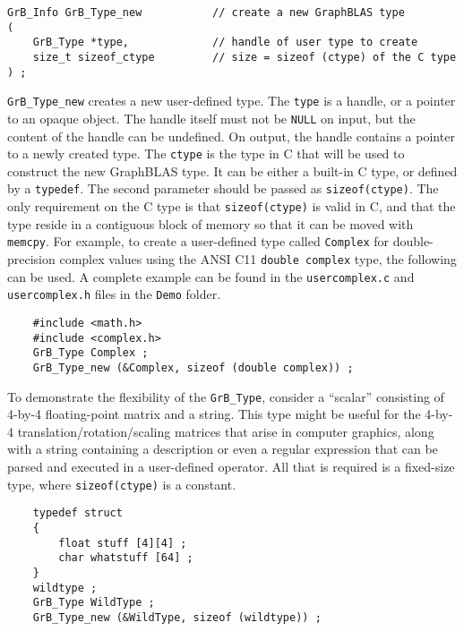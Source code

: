 \documentclass[12pt]{article}
\begin{document}
{\begin{mdframed}[userdefinedwidth=6in]
{\footnotesize
\begin{verbatim}
GrB_Info GrB_Type_new           // create a new GraphBLAS type
(
    GrB_Type *type,             // handle of user type to create
    size_t sizeof_ctype         // size = sizeof (ctype) of the C type
) ;
\end{verbatim}
}\end{mdframed}

\verb'GrB_Type_new' creates a new user-defined type.  The \verb'type' is a
handle, or a pointer to an opaque object.  The handle itself must not be
\verb'NULL' on input, but the content of the handle can be undefined.  On
output, the handle contains a pointer to a newly created type.
The \verb'ctype' is the type in C that will be used to construct the new
GraphBLAS type.  It can be either a built-in C type, or defined by a
\verb'typedef'.
The second parameter should be passed as \verb'sizeof(ctype)'.  The only
requirement on the C type is that \verb'sizeof(ctype)' is valid in C, and
that the type reside in a contiguous block of memory so that it can be moved
with \verb'memcpy'.  For example, to create a user-defined type called
\verb'Complex' for double-precision complex values using the ANSI C11
\verb'double complex' type, the following can be used.  A complete example can
be found in the \verb'usercomplex.c' and \verb'usercomplex.h' files in the
\verb'Demo' folder.

    {\footnotesize
    \begin{verbatim}
    #include <math.h>
    #include <complex.h>
    GrB_Type Complex ;
    GrB_Type_new (&Complex, sizeof (double complex)) ;    \end{verbatim} }

To demonstrate the flexibility of the \verb'GrB_Type', consider a ``scalar''
consisting of 4-by-4 floating-point matrix and a string.  This type might be
useful for the 4-by-4 translation/rotation/scaling matrices that arise in
computer graphics, along with a string containing a description or even a
regular expression that can be parsed and executed in a user-defined operator.
All that is required is a fixed-size type, where \verb'sizeof(ctype)' is
a constant.

    {\footnotesize
    \begin{verbatim}
    typedef struct
    {
        float stuff [4][4] ;
        char whatstuff [64] ;
    }
    wildtype ;
    GrB_Type WildType ;
    GrB_Type_new (&WildType, sizeof (wildtype)) ; \end{verbatim} }

}
\end{document}
